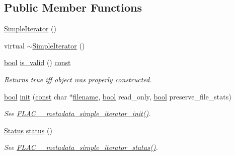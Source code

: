 \subsection*{Public Member Functions}
\begin{DoxyCompactItemize}
\item 
\hyperlink{class_f_l_a_c_1_1_metadata_1_1_simple_iterator_a4b344fc98d6eb7121ce39b751f703af8}{Simple\+Iterator} ()
\item 
virtual \hyperlink{class_f_l_a_c_1_1_metadata_1_1_simple_iterator_ab74bd4d94a4c20b31804bbae34e2e318}{$\sim$\+Simple\+Iterator} ()
\item 
\hyperlink{mac_2config_2i386_2lib-src_2libsoxr_2soxr-config_8h_abb452686968e48b67397da5f97445f5b}{bool} \hyperlink{class_f_l_a_c_1_1_metadata_1_1_simple_iterator_acd4f5f18a3b5f7c42677e6a234543366}{is\+\_\+valid} () \hyperlink{getopt1_8c_a2c212835823e3c54a8ab6d95c652660e}{const} 
\begin{DoxyCompactList}\small\item\em Returns {\ttfamily true} iff object was properly constructed. \end{DoxyCompactList}\item 
\hyperlink{mac_2config_2i386_2lib-src_2libsoxr_2soxr-config_8h_abb452686968e48b67397da5f97445f5b}{bool} \hyperlink{class_f_l_a_c_1_1_metadata_1_1_simple_iterator_a67dc75f18d282f41696467f1fbf5c3e8}{init} (\hyperlink{getopt1_8c_a2c212835823e3c54a8ab6d95c652660e}{const} char $\ast$\hyperlink{test__portburn_8cpp_a7efa5e9c7494c7d4586359300221aa5d}{filename}, \hyperlink{mac_2config_2i386_2lib-src_2libsoxr_2soxr-config_8h_abb452686968e48b67397da5f97445f5b}{bool} read\+\_\+only, \hyperlink{mac_2config_2i386_2lib-src_2libsoxr_2soxr-config_8h_abb452686968e48b67397da5f97445f5b}{bool} preserve\+\_\+file\+\_\+stats)
\begin{DoxyCompactList}\small\item\em See \hyperlink{group__flac__metadata__level1_ga2a055cca4e6e06ae62517c8b0fa6e8a3}{F\+L\+A\+C\+\_\+\+\_\+metadata\+\_\+simple\+\_\+iterator\+\_\+init()}. \end{DoxyCompactList}\item 
\hyperlink{class_f_l_a_c_1_1_metadata_1_1_simple_iterator_1_1_status}{Status} \hyperlink{class_f_l_a_c_1_1_metadata_1_1_simple_iterator_a5e3b527b636a97cbe434b92949680174}{status} ()
\begin{DoxyCompactList}\small\item\em See \hyperlink{group__flac__metadata__level1_ga68cfafa2323154f3ee1d3061eafe109f}{F\+L\+A\+C\+\_\+\+\_\+metadata\+\_\+simple\+\_\+iterator\+\_\+status()}. \end{DoxyCompactList}\item 

\end{DoxyCompactItemize}
